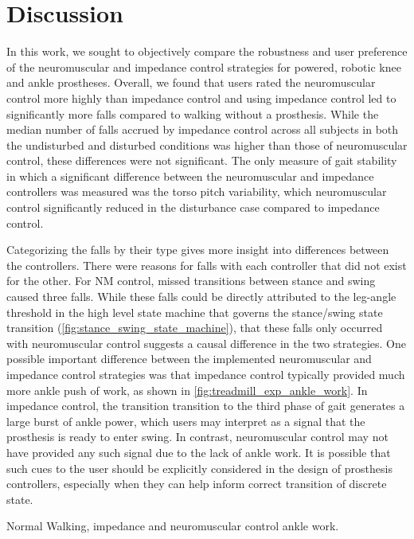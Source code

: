 \section{Discussion}

In this work, we sought to objectively compare the robustness and user
preference of the neuromuscular and impedance control strategies for powered,
robotic knee and ankle prostheses. Overall, we found that users rated the
neuromuscular control more highly than impedance control and using impedance
control led to significantly more falls compared to walking without a
prosthesis. While the median number of falls accrued by impedance control across
all subjects in both the undisturbed and disturbed conditions was higher than
those of neuromuscular control, these differences were not significant. The only
measure of gait stability in which a significant difference between the
neuromuscular and impedance controllers was measured was the torso pitch
variability, which neuromuscular control significantly reduced in the
disturbance case compared to impedance control.

Categorizing the falls by their type gives more insight into differences between
the controllers. There were reasons for falls with each controller that did not
exist for the other. For NM control, missed transitions between stance and swing
caused three falls. While these falls could be directly attributed to the
leg-angle threshold in the high level state machine that governs the
stance/swing state transition (\cref{fig:stance_swing_state_machine}), that
these falls only occurred with neuromuscular control suggests a causal
difference in the two strategies. One possible important difference between the
implemented neuromuscular and impedance control strategies was that impedance
control typically provided much more ankle push of work, as shown in
\cref{fig:treadmill_exp_ankle_work}. In impedance control, the transition
transition to the third phase of gait generates a large burst of ankle power,
which users may interpret as a signal that the prosthesis is ready to enter
swing. In contrast, neuromuscular control may not have provided any such signal
due to the lack of ankle work. It is possible that such cues to the user should
be explicitly considered in the design of prosthesis controllers, especially
when they can help inform correct transition of discrete state.
\begin{marginfigure}
    \centering 
    \caption{Normal Walking, impedance and neuromuscular control ankle
    work.}\label{fig:treadmill_exp_ankle_work}
\end{marginfigure}

